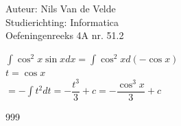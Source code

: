 \documentclass[a4paper]{article}
\begin{document}
  
\noindent \large Auteur: Nils Van de Velde \\
\noindent \large Studierichting: Informatica\\
\noindent \large Oefeningenreeks 4A nr. 51.2\\

\medskip

\normalsize

$\displaystyle\int\cos^2x\sin xdx = \displaystyle\int\cos^2xd(-\cos x)$\\

$t = \cos x$\\

$= -\displaystyle\int t^2dt = -\dfrac{t^3}{3} + c= -\dfrac{\cos^3x}{3}+c$\\

\begin{thebibliography}{999}
\end{thebibliography}
\end{document}
